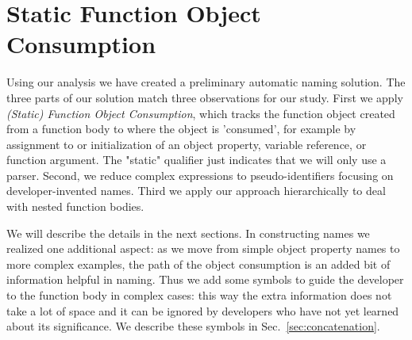 \documentclass[10pt, preprint]{sigplanconf}
\begin{document}
\section{Static  Function Object Consumption}
\label{sec:foc}
Using our analysis we have created a preliminary automatic naming solution.  The three parts of our solution match three observations for our study. First we apply 
 \textit{(Static) Function Object Consumption}, which tracks the function object created from a function body to where the object is 'consumed', for example by assignment to or initialization of  an object property, variable reference, or function argument. The "static" qualifier just indicates that we will only use a parser.  Second, we reduce complex expressions to pseudo-identifiers focusing on developer-invented names.  Third we apply our approach hierarchically to  deal with nested function bodies.

We will describe the details in the next sections. In constructing names we realized one additional aspect: as we move from simple object property names to more complex examples, the path of the object consumption is an added bit of information helpful in naming. Thus we add some symbols to guide the developer to the function body in complex cases: this way the extra information does not take a lot of space and it can be ignored by developers who have not yet learned about its significance. We describe these symbols in Sec.~\ref{sec:concatenation}.


 
\end{document}

